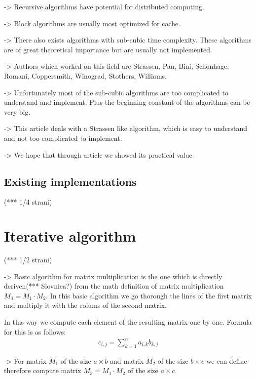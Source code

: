 \documentclass[a4paper,11pt]{article}
\begin{document}
->
Recursive algorithms have potential for 
distributed computing.

->
Block algorithms are usually most optimized 
for cache.

->
There also exists algorithms with sub-cubic 
time complexity. These algorithms are of 
great theoretical importance but are usually 
not implemented.

->
Authors which worked on this field are 
Strassen, Pan, Bini, Schonhage, Romani, Coppersmith, Winograd, Stothers,
Williams.

->
Unfortunately most of the sub-cubic algorithms 
are too complicated to understand and implement. 
Plus the beginning constant of the algorithms 
can be very big. 

->
This article deals with a Strassen like algorithm, 
which is easy to understand and not too complicated
to implement.  

->
We hope that through article we showed 
its practical value.

\subsection{Existing implementations}
(*** 1/4 strani)


\section{Iterative algorithm}
(*** 1/2 strani)

->
Basic algorithm for matrix multiplication is the one which 
is directly deriven(*** Slovnica?) from the math definition of matrix multiplication
$M_{3} = M_{1} \cdot M_{2}$.
In this basic algorithm we go thorough the lines of the first matrix and 
multiply it with the colums of the second matrix.

In this way we compute each element of the resulting matrix one by one.
Formula for this is as follows:
\begin{align*}
c_{i,j} = \sum_{k=1}^{n} a_{i,k} b_{k,j}
\end{align*}

->
For matrix $M_{1}$ of the size $a \times b$ and matrix $M_{2}$ of the size 
$b \times c$ we can define therefore compute matrix $M_{3}= M_{1} \cdot M_{2}$ 
of the size $a \times c$.
\end{document}

